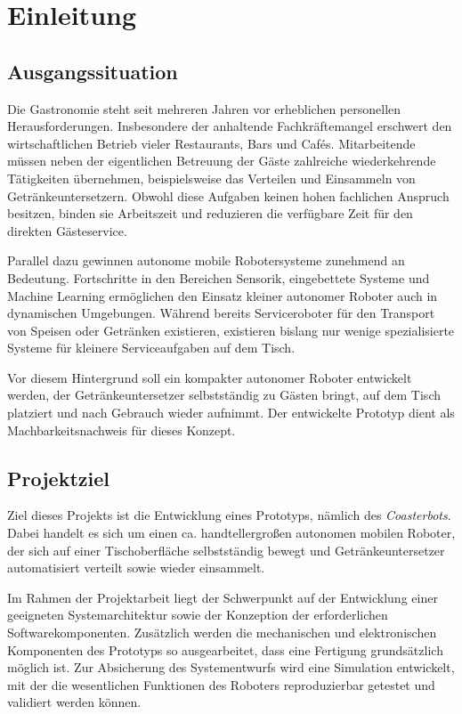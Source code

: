 \section{Einleitung}\label{einleitung}

\subsection{Ausgangssituation}\label{ausgangssituation}

Die Gastronomie steht seit mehreren Jahren vor erheblichen personellen
Herausforderungen. Insbesondere der anhaltende Fachkräftemangel
erschwert den wirtschaftlichen Betrieb vieler Restaurants, Bars und
Cafés. Mitarbeitende müssen neben der eigentlichen Betreuung der Gäste
zahlreiche wiederkehrende Tätigkeiten übernehmen, beispielsweise das
Verteilen und Einsammeln von Getränkeuntersetzern. Obwohl diese Aufgaben
keinen hohen fachlichen Anspruch besitzen, binden sie Arbeitszeit und
reduzieren die verfügbare Zeit für den direkten Gästeservice.

Parallel dazu gewinnen autonome mobile Robotersysteme zunehmend an
Bedeutung. Fortschritte in den Bereichen Sensorik, eingebettete Systeme
und Machine Learning ermöglichen den Einsatz kleiner autonomer Roboter
auch in dynamischen Umgebungen. Während bereits Serviceroboter für den
Transport von Speisen oder Getränken existieren, existieren bislang nur
wenige spezialisierte Systeme für kleinere Serviceaufgaben auf dem
Tisch.

Vor diesem Hintergrund soll ein kompakter autonomer Roboter entwickelt
werden, der Getränkeuntersetzer selbstständig zu Gästen bringt, auf dem
Tisch platziert und nach Gebrauch wieder aufnimmt. Der entwickelte
Prototyp dient als Machbarkeitsnachweis für dieses Konzept.

\subsection{Projektziel}\label{projektziel}

Ziel dieses Projekts ist die Entwicklung eines Prototyps, nämlich des
\emph{Coasterbots}. Dabei handelt es sich um einen ca. handtellergroßen
autonomen mobilen Roboter, der sich auf einer Tischoberfläche
selbstständig bewegt und Getränkeuntersetzer automatisiert verteilt
sowie wieder einsammelt.

Im Rahmen der Projektarbeit liegt der Schwerpunkt auf der Entwicklung
einer geeigneten Systemarchitektur sowie der Konzeption der
erforderlichen Softwarekomponenten. Zusätzlich werden die mechanischen
und elektronischen Komponenten des Prototyps so ausgearbeitet, dass eine
Fertigung grundsätzlich möglich ist. Zur Absicherung des Systementwurfs
wird eine Simulation entwickelt, mit der die wesentlichen Funktionen des
Roboters reproduzierbar getestet und validiert werden können.

